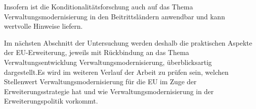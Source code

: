 Insofern ist die Konditionalitätsforschung auch auf das Thema Verwaltungsmodernisierung in den Beitrittsländern anwendbar und kann wertvolle Hinweise liefern. \par
Im nächsten Abschnitt der Untersuchung werden deshalb die praktischen Aspekte der EU-Erweiterung, jeweils mit Rückbindung an das Thema Verwaltungsentwicklung \/ Verwaltungsmodernisierung, überblicksartig dargestellt.Es wird im weiteren Verlauf der Arbeit zu prüfen sein, welchen Stellenwert Verwaltungsmodernisierung für die EU im Zuge der Erweiterungsstrategie hat und wie Verwaltungsmodernisierung in der Erweiterungspolitik vorkommt.
